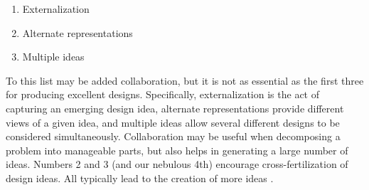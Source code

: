 \documentclass[letterpaper,10pt]{article}
\begin{document}
                    \begin{enumerate}
                        \item Externalization
                        \item Alternate representations
                        \item Multiple ideas
                    \end{enumerate}

                To this list may be added collaboration, but it is not as 
                essential as the first three for producing excellent 
                designs.  Specifically, externalization is the act of 
                capturing an emerging design idea, alternate representations 
                provide different views of a given idea, and multiple ideas 
                allow several different designs to be considered 
                simultaneously.  Collaboration may be useful when decomposing 
                a problem into manageable parts, but also helps in generating 
                a large number of ideas.  Numbers 2 and 3 (and our nebulous 
                4th) encourage cross-fertilization of design ideas.  All 
                typically lead to the creation of more ideas 
                \cite{hailpern_hinterbichler_etal}.
\end{document}
